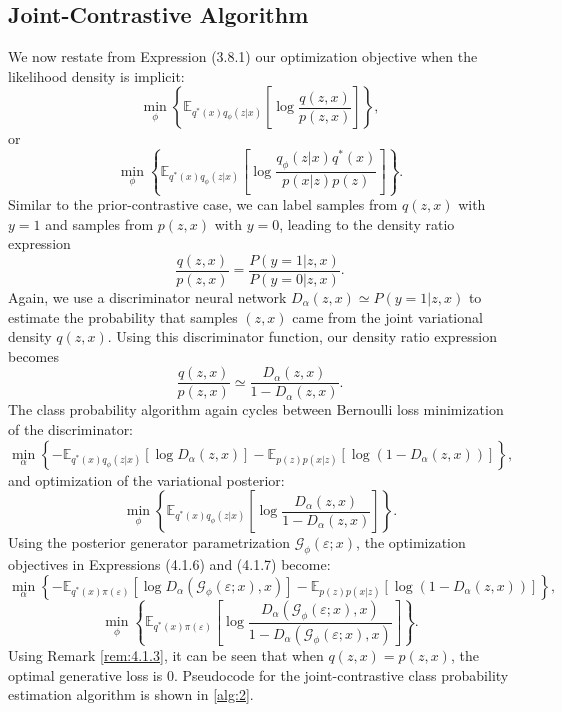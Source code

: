 \documentclass[honours,12pt, twoside]{unswthesis}
\numberwithin{equation}{section}
\theoremstyle{definition}
\begin{document}
\subsection{Joint-Contrastive Algorithm}\label{sec:4.1.3}
We now restate from Expression (3.8.1) our optimization objective when the likelihood density is implicit:
\[\min_\phi \left\lbrace\mathbb{E}_{q^*(x)q_\phi(z|x)}\left[\log \frac{q(z,x)}{p(z,x)}\right]\right\rbrace,\]
or
\[\min_\phi \left\lbrace\mathbb{E}_{q^*(x)q_\phi(z|x)}\left[\log \frac{q_\phi(z|x)q^*(x)}{p(x|z)p(z)}\right]\right\rbrace.\]
Similar to the prior-contrastive case, we can label samples from $q(z,x)$ with $y=1$ and samples from $p(z,x)$ with $y=0$, leading to the density ratio expression
\[\frac{q(z,x)}{p(z,x)}=\frac{P(y=1|z,x)}{P(y=0|z,x)}.\]
Again, we use a discriminator neural network $D_\alpha(z,x)\simeq P(y=1|z,x)$ to estimate the probability that samples $(z,x)$ came from the joint variational density $q(z,x)$. Using this discriminator function, our density ratio expression becomes
\[\frac{q(z,x)}{p(z,x)}\simeq\frac{D_\alpha(z,x)}{1-D_\alpha(z,x)}.\]
The class probability algorithm again cycles between Bernoulli loss minimization of the discriminator:
\begin{equation}
\min_\alpha \left\lbrace-\mathbb{E}_{q^*(x)q_\phi(z|x)}[\log D_\alpha(z,x)]-\mathbb{E}_{p(z)p(x|z)}[\log (1-D_\alpha(z,x))]\right\rbrace,
\end{equation}
and optimization of the variational posterior:
\begin{equation}
\min_\phi \left\lbrace\mathbb{E}_{q^*(x)q_\phi(z|x)}\left[\log\frac{D_\alpha(z,x)}{1-D_\alpha(z,x)}\right]\right\rbrace.
\end{equation}
Using the posterior generator parametrization $\mathcal{G}_\phi (\varepsilon;x)$, the optimization objectives in Expressions (4.1.6) and (4.1.7) become:
\[\min_\alpha \left\lbrace-\mathbb{E}_{q^*(x)\pi(\varepsilon)}[\log D_\alpha(\mathcal{G}_\phi(\varepsilon;x), x)]-\mathbb{E}_{p(z)p(x|z)}[\log (1-D_\alpha(z,x))]\right\rbrace,\]
\[\min_\phi \left\lbrace\mathbb{E}_{q^*(x)\pi(\varepsilon)}\left[\log\frac{D_\alpha(\mathcal{G}_\phi(\varepsilon;x),x)}{1-D_\alpha(\mathcal{G}_\phi(\varepsilon;x),x)}\right]\right\rbrace.\]
Using Remark \ref{rem:4.1.3}, it can be seen that when $q(z,x)=p(z,x)$, the optimal generative loss is $0$. Pseudocode for the joint-contrastive class probability estimation algorithm is shown in \autoref{alg:2}.
\newpage
\end{document}
